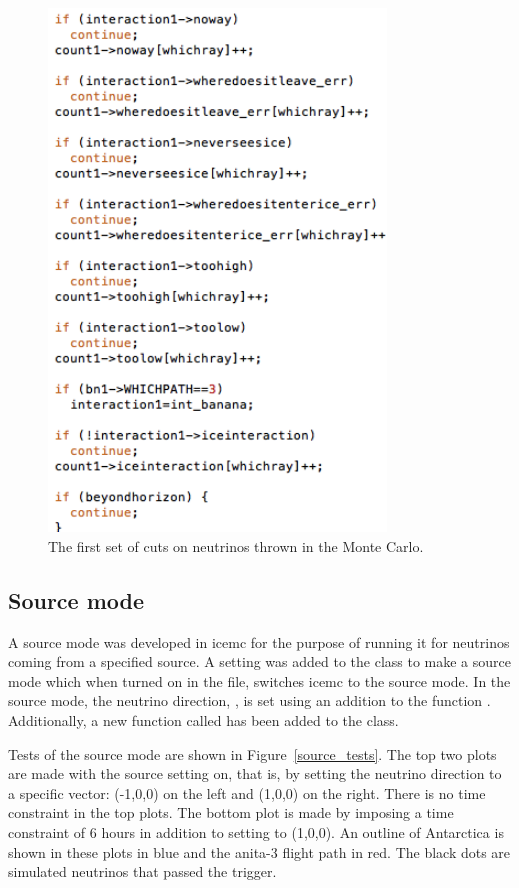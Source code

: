 \begin{figure}
\centering
\includegraphics[width=0.8\textwidth]
{figures/icemc_first_continues.png}
\caption{The first set of cuts on neutrinos thrown in the Monte Carlo.}
\label{first_continues}
\end{figure}

\subsection{Source mode}

A source mode was developed in icemc for the purpose of running it for neutrinos coming from a specified source.
A setting was added to the  class to make a source mode which when turned on in the  file, switches icemc to the source mode.
In the source mode, the neutrino direction, , is set using an addition to the function . Additionally, a new function called  has been added to the  class. 

Tests of the source mode are shown in Figure~\ref{source_tests}. The top two plots are made with the source setting on, that is, by setting the neutrino direction to a specific vector: (-1,0,0) on the left and (1,0,0) on the right. There is no time constraint in the top plots. The bottom plot is made by imposing a time constraint of 6 hours in addition to setting  to (1,0,0). An outline of Antarctica is shown in these plots in blue and the \gls{anita}-3 flight path in red. The black dots are simulated neutrinos that passed the trigger. 

